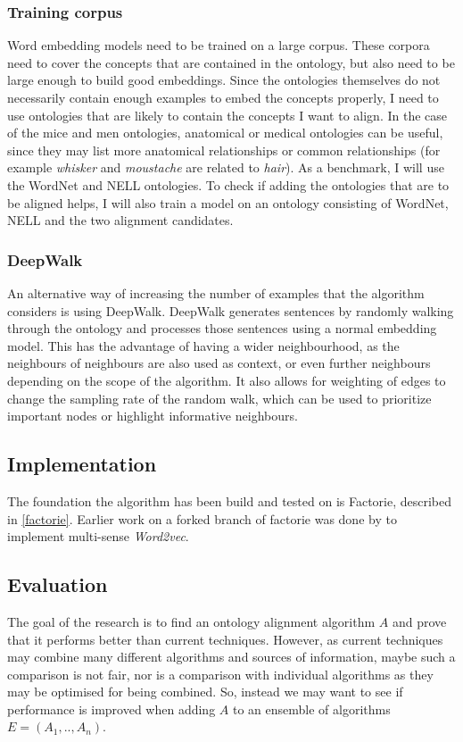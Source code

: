 \documentclass{article}
\begin{document}
 \subsubsection{Training corpus}
  Word embedding models need to be trained on a large corpus. These corpora need to cover the concepts that are contained in the ontology, but also need to be large enough to build good embeddings. Since the ontologies themselves do not necessarily contain enough examples to embed the concepts properly, I need to use ontologies that are likely to contain the concepts I want to align. In the case of the mice and men ontologies, anatomical or medical ontologies can be useful, since they may list more anatomical relationships or common relationships (for example \emph{whisker} and \emph{moustache} are related to \emph{hair}).
  As a benchmark, I will use the WordNet and NELL ontologies. To check if adding the ontologies that are to be aligned helps, I will also train a model on an ontology consisting of WordNet, NELL and the two alignment candidates.
 \subsubsection{DeepWalk}
  An alternative way of increasing the number of examples that the algorithm considers is using DeepWalk. DeepWalk generates sentences by randomly walking through the ontology and processes those sentences using a normal embedding model. This has the advantage of having a wider neighbourhood, as the neighbours of neighbours are also used as context, or even further neighbours depending on the scope of the algorithm. It also allows for weighting of edges to change the sampling rate of the random walk, which can be used to prioritize important nodes or highlight informative neighbours.

 \subsection{Implementation}
 The foundation the algorithm has been build and tested on is Factorie, described in \ref{factorie}. Earlier work on a forked branch of factorie was done by \cite{multisensecode} to implement multi-sense \emph{Word2vec}.
 
 \newpage
 \subsection{Evaluation}
 The goal of the research is to find an ontology alignment algorithm $A$ and prove that it performs better than current techniques. However, as current techniques may combine many different algorithms and sources of information, maybe such a comparison is not fair, nor is a comparison with individual algorithms as they may be optimised for being combined. So, instead we may want to see if performance is improved when adding $A$ to an ensemble of algorithms $E=(A_1,..,A_n)$.
\end{document}
